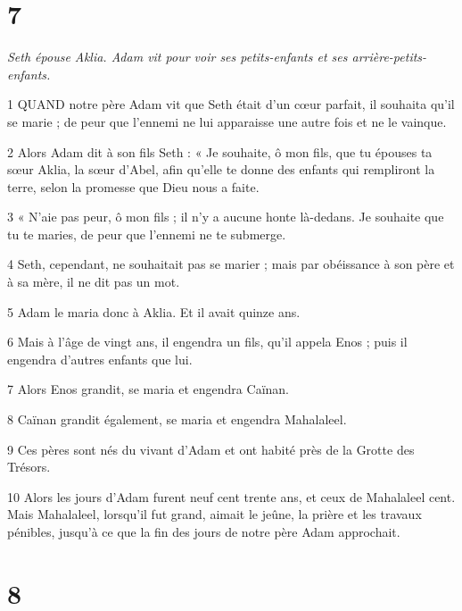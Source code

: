 \chapter{7}

\par \textit{Seth épouse Aklia. Adam vit pour voir ses petits-enfants et ses arrière-petits-enfants.}

\par 1 QUAND notre père Adam vit que Seth était d'un cœur parfait, il souhaita qu'il se marie ; de peur que l'ennemi ne lui apparaisse une autre fois et ne le vainque.

\par 2 Alors Adam dit à son fils Seth : « Je souhaite, ô mon fils, que tu épouses ta sœur Aklia, la sœur d'Abel, afin qu'elle te donne des enfants qui rempliront la terre, selon la promesse que Dieu nous a faite.

\par 3 « N'aie pas peur, ô mon fils ; il n’y a aucune honte là-dedans. Je souhaite que tu te maries, de peur que l'ennemi ne te submerge.

\par 4 Seth, cependant, ne souhaitait pas se marier ; mais par obéissance à son père et à sa mère, il ne dit pas un mot.

\par 5 Adam le maria donc à Aklia. Et il avait quinze ans.

\par 6 Mais à l'âge de vingt ans, il engendra un fils, qu'il appela Enos ; puis il engendra d'autres enfants que lui.

\par 7 Alors Enos grandit, se maria et engendra Caïnan.

\par 8 Caïnan grandit également, se maria et engendra Mahalaleel.

\par 9 Ces pères sont nés du vivant d'Adam et ont habité près de la Grotte des Trésors.

\par 10 Alors les jours d'Adam furent neuf cent trente ans, et ceux de Mahalaleel cent. Mais Mahalaleel, lorsqu'il fut grand, aimait le jeûne, la prière et les travaux pénibles, jusqu'à ce que la fin des jours de notre père Adam approchait.

\chapter{8}

